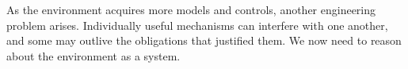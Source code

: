 
As the environment acquires more models and controls, another engineering problem arises. Individually useful mechanisms can interfere with one another, and some may outlive the obligations that justified them. We now need to reason about the environment as a system.
